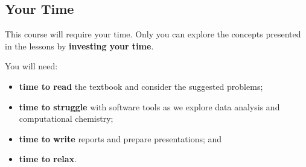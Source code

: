 \newpage
\subsection{Your Time}

This course will require your time. Only you can explore the concepts presented in the lessons by \textbf{investing your time}.

You will need:

\begin{itemize}
\item \textbf{time to read} the textbook and consider the suggested problems;
\item \textbf{time to struggle} with software tools as we explore data analysis and computational chemistry;
\item \textbf{time to write} reports and prepare presentations; and
\item \textbf{time to relax}.
\end{itemize}